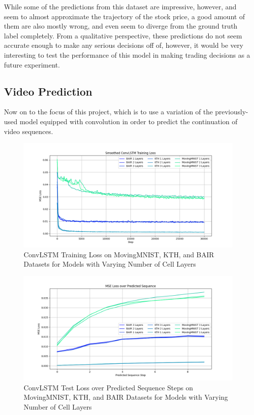 \documentclass{scrartcl}
\begin{document}
While some of the predictions from this dataset are impressive, however, and
seem to almost approximate the trajectory of the stock price, a good amount of
them are also mostly wrong, and even seem to diverge from the ground truth
label completely. From a qualitative perspective, these predictions do not seem
accurate enough to make any serious decisions off of, however, it would be very
interesting to test the performance of this model in making trading decisions
as a future experiment.

\newpage
\subsection{Video Prediction}
\label{subsec:experiment_vp}

Now on to the focus of this project, which is to use a variation of the
previously-used model equipped with convolution in order to predict the
continuation of video sequences. 
 
\begin{figure}[H]
	\centering
	\includegraphics[width=1\textwidth]{plots/convlstm_train_loss.png}
	\caption{ConvLSTM Training Loss on MovingMNIST, KTH, and BAIR Datasets for Models with Varying Number of Cell Layers}
	\label{plt:convlstm_train_loss}
\end{figure}

\begin{figure}[H]
	\centering
	\includegraphics[width=1\textwidth]{plots/convlstm_seq_loss.png}
	\caption{ConvLSTM Test Loss over Predicted Sequence Steps on MovingMNIST, KTH, and BAIR Datasets for Models with Varying Number of Cell Layers}
	\label{plt:convlstm_seq_loss}
\end{figure}
\end{document}
